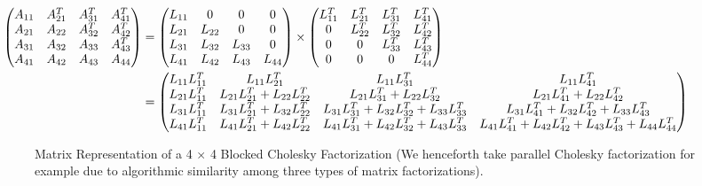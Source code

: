 \documentclass[12pt]{elsarticle}
\begin{document}
\begin{figure*}\scriptsize \begin{align*}
\hspace{-5.6em}\begin{pmatrix}
A_{11} & A_{21}^T & A_{31}^T & A_{41}^T\\
A_{21} & A_{22}   & A_{32}^T & A_{42}^T\\
A_{31} & A_{32}   & A_{33}   & A_{43}^T\\
A_{41} & A_{42}   & A_{43}   & A_{44}
\end{pmatrix}
&=
\begin{pmatrix}
L_{11} & 0        & 0        & 0\\
L_{21} & L_{22}   & 0        & 0\\
L_{31} & L_{32}   & L_{33}   & 0\\
L_{41} & L_{42}   & L_{43}   & L_{44}
\end{pmatrix}
\times
\begin{pmatrix}
L_{11}^T & L_{21}^T & L_{31}^T & L_{41}^T\\
0        & L_{22}^T & L_{32}^T & L_{42}^T\\
0        & 0        & L_{33}^T & L_{43}^T\\
0        & 0        & 0        & L_{44}^T
\end{pmatrix}
\\
&=
\begin{pmatrix}
L_{11}L_{11}^T & L_{11}L_{21}^T                & L_{11}L_{31}^T                               & L_{11}L_{41}^T\\
L_{21}L_{11}^T & L_{21}L_{21}^T+L_{22}L_{22}^T & L_{21}L_{31}^T+L_{22}L_{32}^T                & L_{21}L_{41}^T+L_{22}L_{42}^T\\
L_{31}L_{11}^T & L_{31}L_{21}^T+L_{32}L_{22}^T & L_{31}L_{31}^T+L_{32}L_{32}^T+L_{33}L_{33}^T & L_{31}L_{41}^T+L_{32}L_{42}^T+L_{33}L_{43}^T\\
L_{41}L_{11}^T & L_{41}L_{21}^T+L_{42}L_{22}^T & L_{41}L_{31}^T+L_{42}L_{32}^T+L_{43}L_{33}^T & L_{41}L_{41}^T+L_{42}L_{42}^T+L_{43}L_{43}^T+L_{44}L_{44}^T
\end{pmatrix}
\end{align*}
\caption{Matrix Representation of a 4 $\times$ 4 Blocked Cholesky Factorization (We henceforth take parallel Cholesky factorization for example due to algorithmic similarity among three types of matrix factorizations).}
\label{Cholesky_matrix}
\end{figure*}
\end{document}
